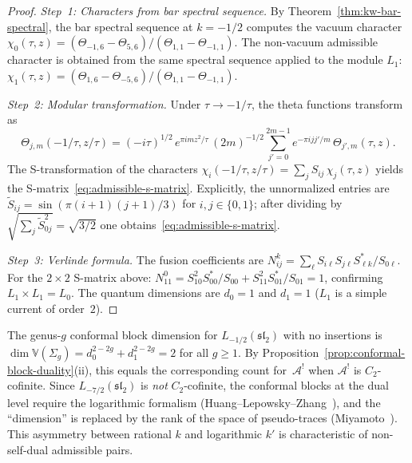 \begin{proof}
\emph{Step~1: Characters from bar spectral sequence.}
By Theorem~\ref{thm:kw-bar-spectral}, the bar spectral
sequence at $k = -1/2$ computes the vacuum character
$\chi_0(\tau, z) = (\Theta_{-1,6} - \Theta_{5,6})/
(\Theta_{1,1} - \Theta_{-1,1})$.  The non-vacuum admissible
character is obtained from the same spectral sequence
applied to the module $L_1$:
$\chi_1(\tau, z) = (\Theta_{1,6} - \Theta_{-5,6})/
(\Theta_{1,1} - \Theta_{-1,1})$.

\emph{Step~2: Modular transformation.}
Under $\tau \to -1/\tau$, the theta functions transform as
\[
\Theta_{j,m}(-1/\tau, z/\tau)
= (-i\tau)^{1/2}\, e^{\pi i m z^2/\tau}\,
(2m)^{-1/2}\sum_{j'=0}^{2m-1}
e^{-\pi i j j'/m}\, \Theta_{j',m}(\tau, z).
\]
The S-transformation of the characters
$\chi_i(-1/\tau, z/\tau) = \sum_j S_{ij}\, \chi_j(\tau, z)$
yields the S-matrix~\eqref{eq:admissible-s-matrix}.
Explicitly, the unnormalized entries are
$\tilde{S}_{ij} = \sin(\pi(i+1)(j+1)/3)$ for
$i, j \in \{0, 1\}$; after dividing by
$\sqrt{\sum_j \tilde{S}_{0j}^2} = \sqrt{3/2}$
one obtains~\eqref{eq:admissible-s-matrix}.

\emph{Step~3: Verlinde formula.}
The fusion coefficients are
$N_{ij}^k = \sum_\ell S_{i\ell} S_{j\ell}
S_{\ell k}^*/S_{0\ell}$.
For the $2 \times 2$ S-matrix above:
$N_{11}^0 = S_{10}^2 S_{00}^*/S_{00}
+ S_{11}^2 S_{01}^*/S_{01} = 1$,
confirming $L_1 \times L_1 = L_0$.
The quantum dimensions are $d_0 = 1$ and $d_1 = 1$
($L_1$ is a simple current of order~$2$).
\end{proof}

\begin{remark}
\label{rem:admissible-verlinde-complementarity}
The genus-$g$ conformal block dimension for $L_{-1/2}(\mathfrak{sl}_2)$
with no insertions is $\dim \mathbb{V}(\Sigma_g) = d_0^{2-2g}
+ d_1^{2-2g} = 2$ for all $g \geq 1$.  By
Proposition~\ref{prop:conformal-block-duality}(ii),
this equals the corresponding count for~$\mathcal{A}^!$
when $\mathcal{A}^!$ is $C_2$-cofinite.
Since $L_{-7/2}(\mathfrak{sl}_2)$ is \emph{not}
$C_2$-cofinite, the conformal blocks at the dual level
require the logarithmic formalism
(Huang--Lepowsky--Zhang~\cite{HLZ}), and the
``dimension'' is replaced by the rank of the space of
pseudo-traces (Miyamoto~\cite{Miyamoto04}).
This asymmetry between rational $k$ and logarithmic
$k'$ is characteristic of non-self-dual admissible pairs.
\end{remark}

